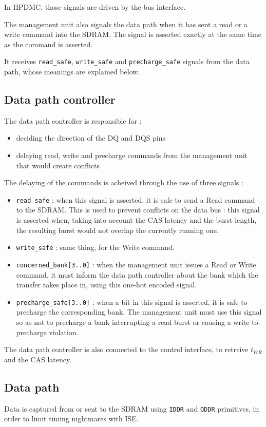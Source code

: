 \documentclass[a4paper,11pt]{article}
\begin{document}
In HPDMC, those signals are driven by the bus interface.

The management unit also signals the data path when it has sent a read or a write command into the SDRAM. The signal is asserted exactly at the same time as the command is asserted.

It receives \verb!read_safe!, \verb!write_safe! and \verb!precharge_safe! signals from the data path, whose meanings are explained below.

\subsection{Data path controller}
The data path controller is responsible for :
\begin{itemize}
\item deciding the direction of the DQ and DQS pins
\item delaying read, write and precharge commands from the management unit that would create conflicts
\end{itemize}

The delaying of the commands is acheived through the use of three signals :
\begin{itemize}
\item \verb!read_safe! : when this signal is asserted, it is safe to send a Read command to the SDRAM. This is used to prevent conflicts on the data bus : this signal is asserted when, taking into account the CAS latency and the burst length, the resulting burst would not overlap the currently running one.
\item \verb!write_safe! : same thing, for the Write command.
\item \verb!concerned_bank[3..0]! : when the management unit issues a Read or Write command, it must inform the data path controller about the bank which the transfer takes place in, using this one-hot encoded signal.
\item \verb!precharge_safe[3..0]! : when a bit in this signal is asserted, it is safe to precharge the corresponding bank. The management unit must use this signal so as not to precharge a bank interrupting a read burst or causing a write-to-precharge violation.
\end{itemize}

The data path controller is also connected to the control interface, to retreive $t_{WR}$ and the CAS latency.

\subsection{Data path}
Data is captured from or sent to the SDRAM using \verb!IDDR! and \verb!ODDR! primitives, in order to limit timing nightmares with ISE.
\end{document}
